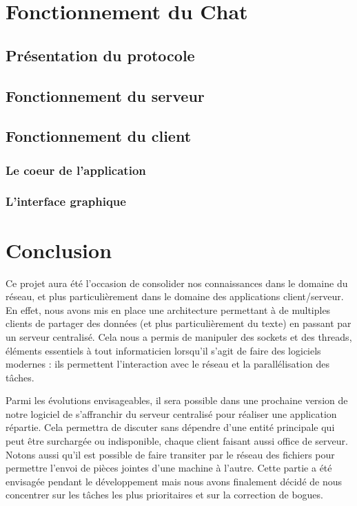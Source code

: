 \chapter{Fonctionnement du Chat}
	
	\section{Présentation du protocole}
	
	\section{Fonctionnement du serveur}
	
	\section{Fonctionnement du client}
		\subsection{Le coeur de l'application}
	
	
		\subsection{L'interface graphique}
			

\chapter*{Conclusion}
	Ce projet aura été l'occasion de consolider nos connaissances dans le domaine du réseau, et plus particulièrement dans le domaine des applications client/serveur. En effet, nous avons mis en place une architecture permettant à de multiples clients de partager des données (et plus particulièrement du texte) en passant par un serveur centralisé. Cela nous a permis de manipuler des sockets et des threads, éléments essentiels à tout informaticien lorsqu'il s'agit de faire des logiciels modernes : ils permettent l'interaction avec le réseau et la parallélisation des tâches.
	
	Parmi les évolutions envisageables, il sera possible dans une prochaine version de notre logiciel de s'affranchir du serveur centralisé pour réaliser une application répartie. Cela permettra de discuter sans dépendre d'une entité principale qui peut être surchargée ou indisponible, chaque client faisant aussi office de serveur. Notons aussi qu'il est possible de faire transiter par le réseau des fichiers pour permettre l'envoi de pièces jointes d'une machine à l'autre. Cette partie a été envisagée pendant le développement mais nous avons finalement décidé de nous concentrer sur les tâches les plus prioritaires et sur la correction de bogues.
